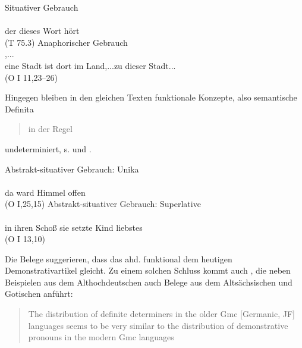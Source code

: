 \begin{exe} 
\ex \label{ex:demske-prag1}
	Situativer Gebrauch \\
	\gll {}    \\
		der dieses Wort hört\\
	\trans {} (T 75.3)
\ex \label{ex:demske-prag2} 
	Anaphorischer Gebrauch \\
	\gll {}     ,...   \\
		eine Stadt ist dort im Land,...zu dieser Stadt...\\
	\trans  {} (O I 11,23--26)
\end{exe}

\noindent 
Hingegen bleiben in den gleichen Texten funktionale Konzepte, also semantische Definita \blockcquote[114]{Demske2001}{in der Regel} undeterminiert, s.  und . 

\begin{exe} 
\ex \label{ex:demske-sem1} 
	Abstrakt-situativer Gebrauch: Unika \\
	\gll {}    \\
		da ward Himmel offen \\
	\trans {} (O I,25,15)  
\ex \label{ex:demske-sem2} 
	Abstrakt-situativer Gebrauch: Superlative \\
	\gll {}      \\
		 in ihren Schoß sie setzte Kind liebstes\\
	\trans  {} (O I 13,10)
\end{exe}

\noindent 
Die Belege suggerieren, dass das ahd.  funktional dem heutigen Demonstrativartikel gleicht. Zu einem solchen Schluss kommt auch \textcite{Philippi1997}, die neben Beispielen aus dem Althochdeutschen auch Belege aus dem  Altsächsischen und Gotischen anführt: \blockcquote[86]{Philippi1997}{The distribution of definite determiners in the older Gmc [Germanic, JF] languages seems to be very similar to the distribution of demonstrative pronouns in the
modern Gmc languages}. 

